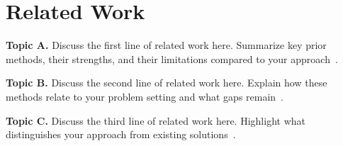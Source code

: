 \section{Related Work}
\label{sec:related_work}

\noindent\textbf{Topic A.}
Discuss the first line of related work here. Summarize key prior methods, their strengths, and their limitations compared to your approach~\cite{vaswani2017attention,he2016deep}.

\noindent\textbf{Topic B.}
Discuss the second line of related work here. Explain how these methods relate to your problem setting and what gaps remain~\cite{devlin2019bert,goodfellow2014generative}.

\noindent\textbf{Topic C.}
Discuss the third line of related work here. Highlight what distinguishes your approach from existing solutions~\cite{kingma2014adam}.
